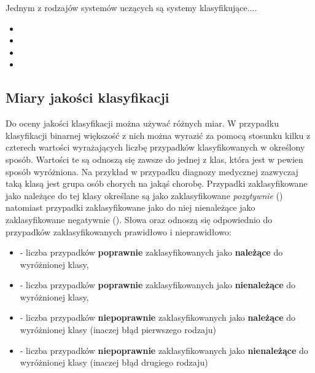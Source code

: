 Jednym z rodzajów systemów uczących są systemy klasyfikujące....

\begin{itemize}
\item {}
\item {}
\item {}
\item {}

\end{itemize}

\subsection{Miary jakości klasyfikacji}
	Do oceny jakości klasyfikacji można używać różnych miar. W przypadku klasyfikacji binarnej większość z nich można wyrazić za pomocą stosunku kilku z czterech wartości wyrażających liczbę przypadków klasyfikowanych w określony sposób. Wartości te są odnoszą się zawsze do jednej z klas, która jest w pewien sposób wyróżniona. Na przykład w przypadku diagnozy medycznej zazwyczaj taką klasą jest grupa osób chorych na jakąś chorobę. Przypadki zaklasyfikowane jako należące do tej klasy określane są jako zaklasyfikowane \textit{pozytywnie} () natomiast przypadki zaklasyfikowane jako do niej nienależące jako zaklasyfikowane negatywnie (). Słowa  oraz  odnoszą się odpowiednio do przypadków zaklasyfikowanych prawidłowo i nieprawidłowo:
	\begin{itemize}
		\item {} - liczba przypadków \textbf{poprawnie} zaklasyfikowanych jako \textbf{należące} do wyróżnionej klasy,
		\item  {} - liczba przypadków \textbf{poprawnie} zaklasyfikowanych jako \textbf{nienależące} do wyróżnionej klasy,
		\item {} - liczba przypadków \textbf{niepoprawnie} zaklasyfikowanych jako \textbf{należące} do wyróżnionej klasy (inaczej błąd pierwszego rodzaju)
		\item {} - liczba przypadków \textbf{niepoprawnie} zaklasyfikowanych jako \textbf{nienależące} do wyróżnionej klasy (inaczej błąd drugiego rodzaju)
	\end{itemize}		
	
